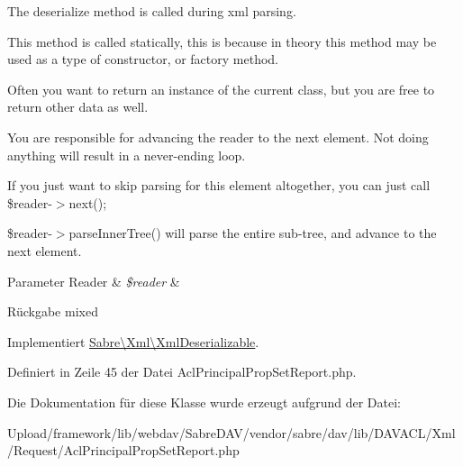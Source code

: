 The deserialize method is called during xml parsing.

This method is called statically, this is because in theory this method may be used as a type of constructor, or factory method.

Often you want to return an instance of the current class, but you are free to return other data as well.

You are responsible for advancing the reader to the next element. Not doing anything will result in a never-\/ending loop.

If you just want to skip parsing for this element altogether, you can just call \$reader-\/$>$next();

\$reader-\/$>$parse\+Inner\+Tree() will parse the entire sub-\/tree, and advance to the next element.


\begin{DoxyParams}[1]{Parameter}
Reader & {\em \$reader} & \\
\hline
\end{DoxyParams}
\begin{DoxyReturn}{Rückgabe}
mixed 
\end{DoxyReturn}


Implementiert \mbox{\hyperlink{interface_sabre_1_1_xml_1_1_xml_deserializable_a19e0eca545b9a0d93f7d6b69085ade30}{Sabre\textbackslash{}\+Xml\textbackslash{}\+Xml\+Deserializable}}.



Definiert in Zeile 45 der Datei Acl\+Principal\+Prop\+Set\+Report.\+php.



Die Dokumentation für diese Klasse wurde erzeugt aufgrund der Datei\+:\begin{DoxyCompactItemize}
\item 
Upload/framework/lib/webdav/\+Sabre\+D\+A\+V/vendor/sabre/dav/lib/\+D\+A\+V\+A\+C\+L/\+Xml/\+Request/Acl\+Principal\+Prop\+Set\+Report.\+php\end{DoxyCompactItemize}
